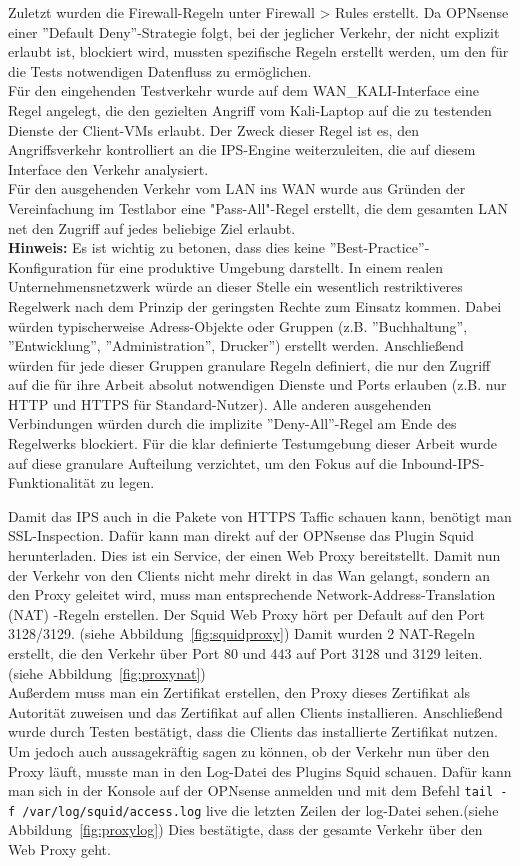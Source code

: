 Zuletzt wurden die Firewall-Regeln unter Firewall > Rules erstellt. Da OPNsense einer ''Default Deny''-Strategie folgt, bei der jeglicher Verkehr, der nicht explizit erlaubt ist, blockiert wird, mussten spezifische Regeln erstellt werden, um den für die Tests notwendigen Datenfluss zu ermöglichen.\\
Für den eingehenden Testverkehr wurde auf dem WAN\_KALI-Interface eine Regel angelegt, die den gezielten Angriff vom Kali-Laptop auf die zu testenden Dienste der Client-VMs erlaubt. Der Zweck dieser Regel ist es, den Angriffsverkehr kontrolliert an die IPS-Engine weiterzuleiten, die auf diesem Interface den Verkehr analysiert.\\

Für den ausgehenden Verkehr vom LAN ins WAN wurde aus Gründen der Vereinfachung im Testlabor eine "Pass-All"-Regel erstellt, die dem gesamten LAN net den Zugriff auf jedes beliebige Ziel erlaubt.\\

\textbf{Hinweis:}
Es ist wichtig zu betonen, dass dies keine ''Best-Practice''-Konfiguration für eine produktive Umgebung darstellt. In einem realen Unternehmensnetzwerk würde an dieser Stelle ein wesentlich restriktiveres Regelwerk nach dem Prinzip der geringsten Rechte zum Einsatz kommen. Dabei würden typischerweise Adress-Objekte oder Gruppen (z.B. ''Buchhaltung'', ''Entwicklung'', ''Administration'', Drucker'') erstellt werden. Anschließend würden für jede dieser Gruppen granulare Regeln definiert, die nur den Zugriff auf die für ihre Arbeit absolut notwendigen Dienste und Ports erlauben (z.B. nur HTTP und HTTPS für Standard-Nutzer). Alle anderen ausgehenden Verbindungen würden durch die implizite ''Deny-All''-Regel am Ende des Regelwerks blockiert. Für die klar definierte Testumgebung dieser Arbeit wurde auf diese granulare Aufteilung verzichtet, um den Fokus auf die Inbound-IPS-Funktionalität zu legen.


Damit das IPS auch in die Pakete von HTTPS Taffic schauen kann, benötigt man SSL-Inspection. Dafür kann man direkt auf der OPNsense das Plugin Squid herunterladen. Dies ist ein Service, der einen Web Proxy bereitstellt. Damit nun der Verkehr von den Clients nicht mehr direkt in das Wan gelangt, sondern an den Proxy geleitet wird, muss man entsprechende Network-Address-Translation (NAT) -Regeln erstellen. Der Squid Web Proxy hört per Default auf den Port 3128/3129. (siehe Abbildung~\ref{fig:squidproxy}) Damit wurden 2 NAT-Regeln erstellt, die den Verkehr über Port 80 und 443 auf Port 3128 und 3129 leiten. (siehe Abbildung~\ref{fig:proxynat})\\
Außerdem muss man ein Zertifikat erstellen, den Proxy dieses Zertifikat als Autorität zuweisen und das Zertifikat auf allen Clients installieren.
Anschließend wurde durch Testen bestätigt, dass die Clients das installierte Zertifikat nutzen. Um jedoch auch aussagekräftig sagen zu können, ob der Verkehr nun über den Proxy läuft, musste man in den Log-Datei des Plugins Squid schauen. Dafür kann man sich in der Konsole auf der OPNsense anmelden und mit dem Befehl \verb |tail -f /var/log/squid/access.log| live die letzten Zeilen der log-Datei sehen.(siehe Abbildung~\ref{fig:proxylog}) Dies bestätigte, dass der gesamte Verkehr über den Web Proxy geht.
